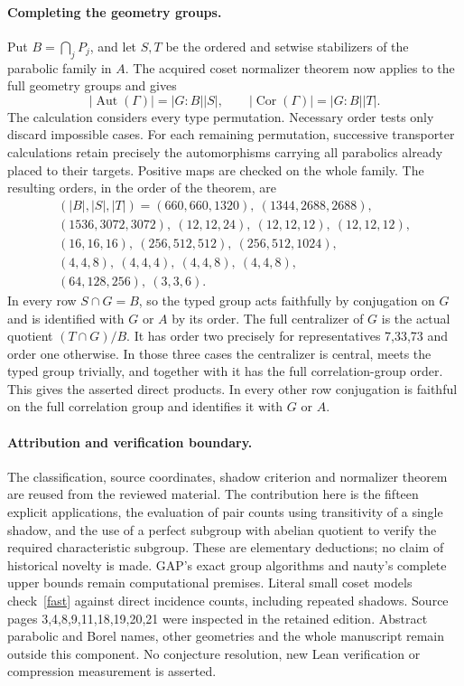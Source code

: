 \documentclass[11pt]{article}
\newcommand{\Aut}{\operatorname{Aut}}\newcommand{\Cor}{\operatorname{Cor}}
\begin{document}
\paragraph{Completing the geometry groups.}
Put $B=\bigcap_jP_j$, and let $S,T$ be the ordered and setwise stabilizers
of the parabolic family in $A$. The acquired coset normalizer theorem now
applies to the full geometry groups and gives
\[
 |\Aut(\Gamma)|=|G:B||S|,\qquad
 |\Cor(\Gamma)|=|G:B||T|.
\]
The calculation considers every type permutation. Necessary order tests
only discard impossible cases. For each remaining permutation, successive
transporter calculations retain precisely the automorphisms carrying all
parabolics already placed to their targets. Positive maps are checked on
the whole family. The resulting orders, in the order of the theorem, are
\[
\begin{gathered}
(|B|,|S|,|T|)=
(660,660,1320),\ (1344,2688,2688),\\
(1536,3072,3072),\ (12,12,24),\ (12,12,12),\ (12,12,12),\\
(16,16,16),\ (256,512,512),\ (256,512,1024),\\
(4,4,8),\ (4,4,4),\ (4,4,8),\ (4,4,8),\\
(64,128,256),\ (3,3,6).
\end{gathered}
\]
In every row $S\cap G=B$, so the typed group acts faithfully by conjugation
on $G$ and is identified with $G$ or $A$ by its order. The full centralizer
of $G$ is the actual quotient $(T\cap G)/B$. It has order two precisely
for representatives 7,33,73 and order one otherwise. In those three cases
the centralizer is central, meets the typed group trivially, and together
with it has the full correlation-group order. This gives the asserted
direct products. In every other row conjugation is faithful on the full
correlation group and identifies it with $G$ or $A$.

\paragraph{Attribution and verification boundary.}
The classification, source coordinates, shadow criterion and normalizer
theorem are reused from the reviewed material. The contribution here is
the fifteen explicit applications, the evaluation of pair counts using
transitivity of a single shadow, and the use of a perfect subgroup with
abelian quotient to verify the required characteristic subgroup. These
are elementary deductions; no claim of historical novelty is made.
GAP's exact group algorithms and nauty's complete upper bounds remain
computational premises. Literal small coset models check~\eqref{fast}
against direct incidence counts, including repeated shadows. Source
pages 3,4,8,9,11,18,19,20,21 were inspected in the retained edition.
Abstract parabolic and Borel names, other geometries and the whole
manuscript remain outside this component. No conjecture resolution,
new Lean verification or compression measurement is asserted.
\end{document}
